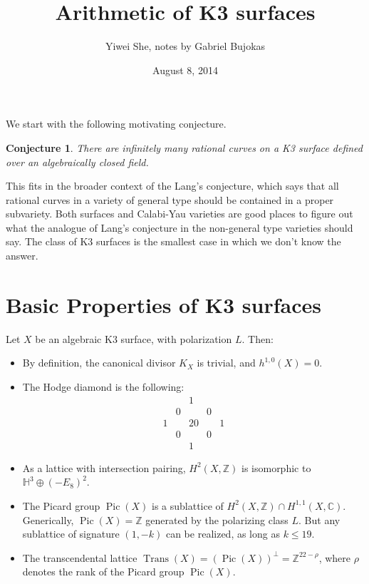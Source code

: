 \documentclass{amsart}
\title{Arithmetic of K3 surfaces}
\author{Yiwei She, notes by Gabriel Bujokas}
\date{August 8, 2014}
\theoremstyle{plain}
\newtheorem*{conjecture}{Conjecture}
\theoremstyle{definition}
\theoremstyle{remark}
\DeclareMathOperator{\Pic}{Pic}
\DeclareMathOperator{\Trans}{Trans}
\begin{document}
\maketitle

We start with the following motivating conjecture.
\begin{conjecture}
There are infinitely many rational
curves on a K3 surface defined over an algebraically closed field.
\end{conjecture}

This fits in the broader context of the Lang's conjecture, which says that all rational curves in a variety of general type should be contained in a proper subvariety. Both surfaces and Calabi-Yau varieties are good places to figure out what the analogue of Lang's conjecture in the non-general type varieties should say. 
The class of K3 surfaces is the smallest case in which we don’t know the answer.

\section{Basic Properties of K3 surfaces}
Let $X$ be an algebraic K3 surface, with polarization $L$. Then:
\begin{itemize}
	\item By definition, the canonical divisor $K_X$ is trivial, and $h^{1,0}(X)=0$.
	\item The Hodge diamond is the following:
	\[
	\begin{matrix}
	  &   & 1  &   & \\
	  & 0 &    & 0 & \\
	1 &   & 20 &   & 1 \\
	  & 0 &    & 0 & \\
	  &   &  1 &   &
	\end{matrix}
	\]
	\item As a lattice with intersection pairing, $H^2(X,\mathbb{Z})$ is isomorphic to 
	$\mathbb{H}^3 \oplus (-E_8)^2$.
	\item The Picard group $\Pic(X)$ is a sublattice of 
	$H^2(X , \mathbb{Z}) \cap H^{1,1}(X ,\mathbb{C})$. Generically, $\Pic (X)= \mathbb{Z}$
	generated by the polarizing class $L$. But any sublattice of signature $(1,-k)$ can be realized,
	as long as $k \leq 19$.
	\item The transcendental lattice $\Trans(X)= \left(\Pic(X) \right)^\perp  = \mathbb{Z}^{22-\rho}$, where
	$\rho$ denotes the rank of the Picard group $\Pic(X)$.
\end{itemize}
\end{document}
